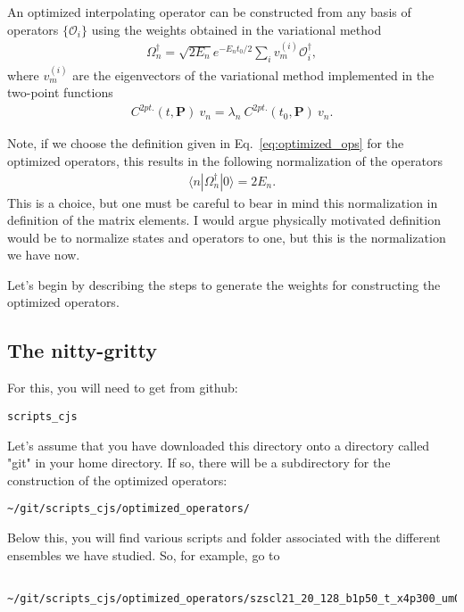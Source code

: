 \documentclass[prd,showpacs,showkeys,preprintnumbers,floatfix,
nofootinbib,superscriptaddress]{revtex4}
\begin{document}
An optimized interpolating operator can be constructed from any basis of operators $\{\mathcal{O}_i\}$ using the weights obtained in the variational method
\begin{align}
\label{eq:optimized_ops}
\Omega_n^\dag= \sqrt{2E_n} e^{-E_nt_0/2}\sum_{i}v^{(i)}_m\mathcal{O}_i^\dag,
\end{align}
where $v^{(i)}_m$ are the eigenvectors of the variational method implemented in the two-point functions
\begin{align}
C^{2pt.}(t,\textbf{P})~v_n=\lambda_n~C^{2pt.}(t_0,\textbf{P})~v_n.
\end{align}

Note, if we choose the definition given in Eq.~\ref{eq:optimized_ops} for the optimized operators, this results in the following normalization of the operators 
\begin{align}
\langle n | \Omega_n^\dag|0\rangle= 2E_n .
\end{align}
 This is a choice, but one must be careful to bear in mind this normalization in definition of the matrix elements. I would argue physically motivated definition would be to normalize states and operators to one, but this is the normalization we have now. 
 
 Let's begin by describing the steps to generate the weights for constructing the optimized operators. 

\subsection{The nitty-gritty}
 
For this, you will need to get from github:  
\footnotesize
\begin{verbatim}
scripts_cjs
\end{verbatim} 
\normalsize
	
Let's assume that you have downloaded this directory onto a directory called "git" in your home directory. If so, there will be a subdirectory for the construction of the optimized operators:
\footnotesize
\begin{verbatim}
~/git/scripts_cjs/optimized_operators/
\end{verbatim} 
\normalsize


Below this, you will find various scripts and folder associated with the different ensembles we have studied. So, for example, go to 
\footnotesize
\begin{verbatim}

~/git/scripts_cjs/optimized_operators/szscl21_20_128_b1p50_t_x4p300_um0p0840_sm0p0743_n1p265_per
\end{verbatim} 
\normalsize
\end{document}
